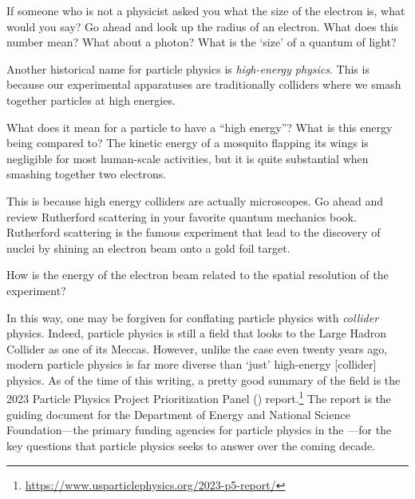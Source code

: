 \documentclass[12pt, oneside]{report}    %
\begin{document}
\begin{exercise}
If someone who is not a physicist asked you what the size of the electron is, what would you say? Go ahead and look up the radius of an electron. What does this number mean? What about a photon? What is the `size' of a quantum of light?\sidenotemark
\end{exercise}

Another historical name for particle physics is \emph{high-energy physics}. This is because our experimental apparatuses are traditionally colliders where we smash together particles at high energies. 
\begin{exercise}
What does it mean for a particle to have a ``high energy''? What is this energy being compared to? The kinetic energy of a mosquito flapping its wings is negligible for most human-scale activities, but it is quite substantial when smashing together two electrons.
\end{exercise}
This is because high energy colliders are actually microscopes. Go ahead and review Rutherford scattering in your favorite quantum mechanics book. Rutherford scattering is the famous experiment that lead to the discovery of nuclei by shining an electron beam onto a gold foil target. 
\begin{exercise}
How is the energy of the electron beam related to the spatial resolution of the experiment?
\end{exercise}
In this way, one may be forgiven for conflating particle physics with \emph{collider} physics. Indeed, particle physics is still a field that looks to the Large Hadron Collider as one of its Meccas. However, unlike the case even twenty years ago, modern particle physics is far more diverse than `just' high-energy [collider] physics. As of the time of this writing, a pretty good summary of the field is the 2023 Particle Physics Project Prioritization Panel () report.\footnote{\url{https://www.usparticlephysics.org/2023-p5-report/}} The report is the guiding document for the Department of Energy and National Science Foundation---the primary funding agencies for particle physics in the ---for the key questions that particle physics seeks to answer over the coming decade.
\end{document}

